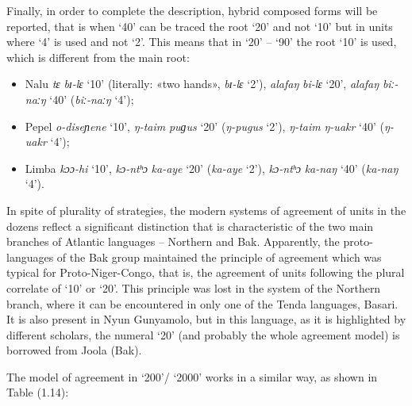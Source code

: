 Finally, in order to complete the description, hybrid composed forms will be reported, that is when `40' can be traced the root `20' and not `10' but in units where `4' is used and not `2'. This means that in ‘20’ – ‘90’ the root ‘10’ is used, which is different from the main root: 

\begin{itemize}
\item Nalu \textit{tɛ} \textit{bɪ-lɛ} ‘10’ (literally: «two hands», \textit{bɪ-lɛ} ‘2’), \textit{alafaŋ} \textit{bi-lɛ} ‘20’, \textit{alafaŋ} \textit{biː-naːŋ} ‘40’ (\textit{biː-naːŋ} ‘4’); 
\item Pepel \textit{o-diseɲene} ‘10’, \textit{ŋ-taim} \textit{puɡus} ‘20’ (\textit{ŋ-pugus} ‘2’), \textit{ŋ-taim} \textit{ŋ-uakr} ‘40’ (\textit{ŋ-uakr} ‘4’);
\item Limba \textit{kɔɔ-hi} ‘10’, \textit{kɔ-ntʰɔ} \textit{ka-aye} ‘20’ (\textit{ka-aye} ‘2’), \textit{kɔ-ntʰɔ} \textit{ka-naŋ} ‘40’ (\textit{ka-naŋ} ‘4’). 
\end{itemize}

In spite of plurality of strategies, the modern systems of agreement of units in the dozens reflect a significant distinction that is characteristic of the two main branches of Atlantic languages – Northern and Bak. Apparently, the proto-languages of the Bak group maintained the principle of agreement which was typical for Proto-Niger-Congo, that is, the agreement of units following the plural correlate of ‘10’ or ‘20’. This principle was lost in the system of the Northern branch, where it can be encountered in only one of the Tenda languages, Basari. It is also present in Nyun Gunyamolo, but in this language, as it is highlighted by different scholars, the numeral ‘20’ (and probably the whole agreement model) is borrowed from Joola (Bak). 

The model of agreement in ‘200’/ ‘2000’ works in a similar way, as shown in Table (1.14): 


